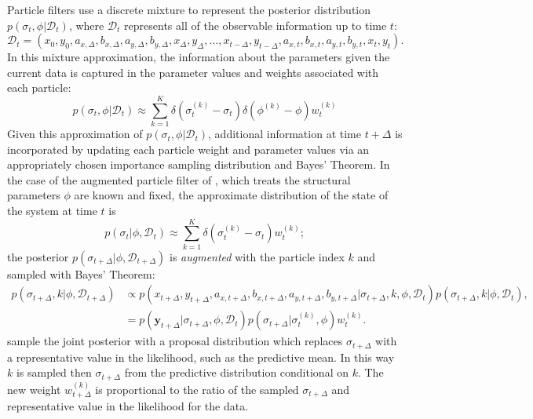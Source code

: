 \documentclass[10pt]{article}
\begin{document}
Particle filters use a discrete mixture to represent the posterior
distribution $p(\sigma_t, \phi | \mathcal{D}_t)$, where
$\mathcal{D}_t$ represents all of the observable information up to
time $t$:
\[
  \mathcal{D}_t = (x_0, y_0, a_{x,\Delta}, b_{x,\Delta}, a_{y,\Delta},
  b_{y,\Delta}, x_\Delta, y_\Delta, \ldots, x_{t-\Delta},
  y_{t-\Delta}, a_{x,t}, b_{x,t}, a_{y,t}, b_{y,t}, x_t, y_t).
\]
In this mixture approximation, the information about the parameters
given the current data is captured in the parameter values and weights
associated with each particle:
\[
  p(\sigma_t, \phi | \mathcal{D}_t) \approx \sum_{k=1}^K \delta(\sigma_t^{(k)} - \sigma_t) \delta(\phi^{(k)} - \phi) w_t^{(k)}
\]
Given this approximation of $p(\sigma_t, \phi | \mathcal{D}_t)$,
additional information at time $t+\Delta$ is incorporated by updating
each particle weight and parameter values via an appropriately chosen
importance sampling distribution and Bayes' Theorem. In the case of
the augmented particle filter of \cite{pitt1999filtering}, which
treats the structural parameters $\phi$ are known and fixed, the
approximate distribution of the state of the system at time $t$ is
\[
  p(\sigma_t | \phi, \mathcal{D}_t) \approx \sum_{k=1}^K
  \delta(\sigma_t^{(k)} - \sigma_t) w_t^{(k)};
\]
the posterior $p(\sigma_{t+\Delta} | \phi, \mathcal{D}_{t+\Delta})$ is
\textit{augmented} with the particle index $k$ and sampled with Bayes' Theorem:
\begin{align}
  p(\sigma_{t+\Delta}, k | \phi, \mathcal{D}_{t+\Delta}) &\propto
                                                           p(x_{t+\Delta}, y_{t+\Delta}, a_{x,t+\Delta}, b_{x, t+\Delta},
                                                           a_{y,t+\Delta}, b_{y, t+\Delta} | \sigma_{t+\Delta}, k, \phi,
                                                           \mathcal{D}_t)p(\sigma_{t+\Delta},k | \phi, \mathcal{D}_t), \\
                                                         &= p(\mathbf{y}_{t+\Delta} | \sigma_{t+\Delta}, \phi, \mathcal{D}_t) p(\sigma_{t+\Delta} | \sigma_{t}^{(k)}, \phi) w^{(k)}_t. \label{eq:augmented-posterior}
\end{align}
\cite{pitt1999filtering} sample the joint posterior with a proposal
distribution which replaces $\sigma_{t+\Delta}$ with a representative
value in the likelihood, such as the predictive
mean. In this way $k$ is sampled then $\sigma_{t+\Delta}$ from the
predictive distribution conditional on $k$. The new weight
$w_{t+\Delta}^{(k)}$ is proportional to the ratio of the sampled
$\sigma_{t+\Delta}$ and representative value in the likelihood for the
data.
\end{document}
